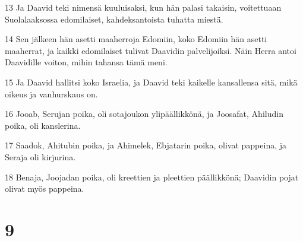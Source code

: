 \par 13 Ja Daavid teki nimensä kuuluisaksi, kun hän palasi takaisin, voitettuaan Suolalaaksossa edomilaiset, kahdeksantoista tuhatta miestä.
\par 14 Sen jälkeen hän asetti maaherroja Edomiin, koko Edomiin hän asetti maaherrat, ja kaikki edomilaiset tulivat Daavidin palvelijoiksi. Näin Herra antoi Daavidille voiton, mihin tahansa tämä meni.
\par 15 Ja Daavid hallitsi koko Israelia, ja Daavid teki kaikelle kansallensa sitä, mikä oikeus ja vanhurskaus on.
\par 16 Jooab, Serujan poika, oli sotajoukon ylipäällikkönä, ja Joosafat, Ahiludin poika, oli kanslerina.
\par 17 Saadok, Ahitubin poika, ja Ahimelek, Ebjatarin poika, olivat pappeina, ja Seraja oli kirjurina.
\par 18 Benaja, Joojadan poika, oli kreettien ja pleettien päällikkönä; Daavidin pojat olivat myös pappeina.

\chapter{9}

